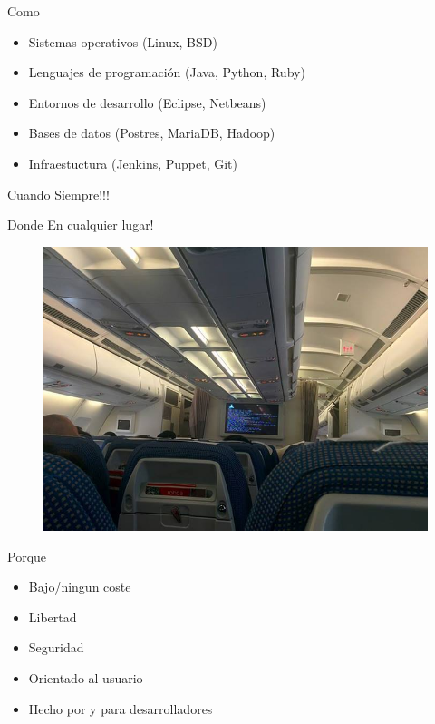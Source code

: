 \documentclass{beamer}
\begin{document}
\begin{frame}{Como}
    \begin{itemize}
    \item Sistemas operativos (Linux, BSD)
    \item Lenguajes de programación (Java, Python, Ruby)
    \item Entornos de desarrollo (Eclipse, Netbeans)
    \item Bases de datos (Postres, MariaDB, Hadoop)
    \item Infraestuctura (Jenkins, Puppet, Git)
    \end{itemize}
\end{frame}

\begin{frame}{Cuando}
Siempre!!!
\end{frame}

\begin{frame}{Donde}
En cualquier lugar!
    \begin{figure}[tbph]
        \centering
        \includegraphics[width=0.7\linewidth]{Images/avion.jpg}
    \end{figure}
\end{frame}

\begin{frame}{Porque}
    \begin{itemize}
        \item Bajo/ningun coste
        \item Libertad
        \item Seguridad
        \item Orientado al usuario
        \item Hecho por y para desarrolladores
    \end{itemize}
\end{frame}

\end{document}
